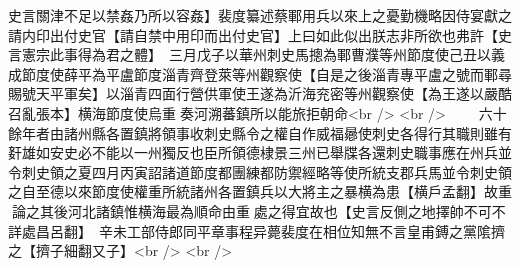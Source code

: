 史言關津不足以禁姦乃所以容姦】裴度纂述蔡鄆用兵以來上之憂勤機略因侍宴獻之請内印出付史官【請自禁中用印而出付史官】上曰如此似出朕志非所欲也弗許【史言憲宗此事得為君之體】　三月戊子以華州刺史馬摠為鄆曹濮等州節度使己丑以義成節度使薛平為平盧節度淄青齊登萊等州觀察使【自是之後淄青專平盧之號而鄆尋賜號天平軍矣】以淄青四面行營供軍使王遂為沂海兖密等州觀察使【為王遂以嚴酷召亂張本】横海節度使烏重奏河溯蕃鎮所以能旅拒朝命<br />
<br />
　　六十餘年者由諸州縣各置鎮將領事收刺史縣令之權自作威福曏使刺史各得行其職則雖有姧雄如安史必不能以一州獨反也臣所領德棣景三州已舉牒各還刺史職事應在州兵並令刺史領之夏四月丙寅詔諸道節度都團練都防禦經略等使所統支郡兵馬並令刺史領之自至德以來節度使權重所統諸州各置鎮兵以大將主之暴横為患【横戶孟翻】故重論之其後河北諸鎮惟横海最為順命由重處之得宜故也【史言反側之地擇帥不可不詳處昌呂翻】　辛未工部侍郎同平章事程异薨裴度在相位知無不言皇甫鎛之黨隂擠之【擠子細翻又子】<br />
<br />
